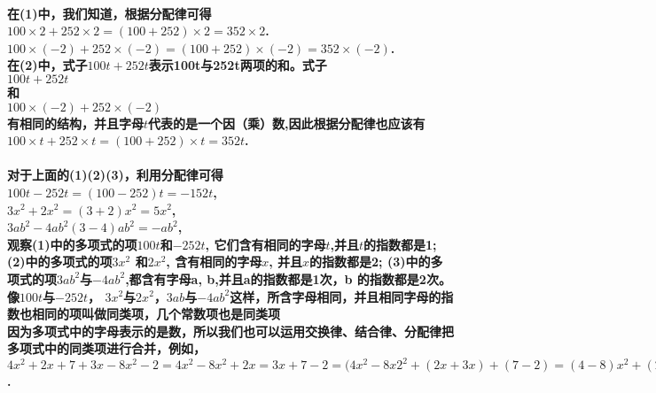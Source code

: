 \documentclass[UTF8]{report}
\theoremstyle{definition}
\theoremstyle{remark}
\begin{document}
\paragraph{在(1)中，我们知道，根据分配律可得\\$100\times2+252\times2=(100+252)\times2=352\times2$.\\$100\times(-2)+252\times(-2)=(100+252)\times(-2)=352\times(-2)$.\\ 在(2)中，式子$100t+252t$表示100t与252t两项的和。式子\\$100t+252t$\\和\\$100\times(-2)+252\times(-2)$\\有相同的结构，并且字母$t$代表的是一个因（乘）数,因此根据分配律也应该有\\$100\times{t}+252\times{t}=(100+252)\times{t}=352t$.}

\paragraph{
对于上面的(1)(2)(3)，利用分配律可得
\\$100t-252t=(100-252)t=-152t$,
\\$3x^{2}+2x^{2}=(3+2)x^{2}=5x^{2}$,
\\$3ab^{2}-4ab^{2}(3-4)ab^{2}=-ab^{2}$,
\\  观察(1)中的多项式的项$100t$和$-252t$, 它们含有相同的字母$t$,并且$t$的指数都是1; (2)中的多项式的项$3x^{2}$ 和$2x^{2}$, 含有相同的字母$x$, 并且$x$的指数都是2; (3)中的多项式的项$3ab^{2}$与$-4ab^{2}$,都含有字母a, b,并且a的指数都是1次，b 的指数都是2次。像$100t$与$-252t$， $3x^{2}$与$2x^{2}$，$3ab$与$-4ab^{2}$这样，所含字母相同，并且相同字母的指数也相同的项叫做同类项，几个常数项也是同类项
\\  因为多项式中的字母表示的是数，所以我们也可以运用交换律、结合律、分配律把多项式中的同类项进行合并，例如，
\\$4x^{2}+2x+7+3x-8x^{2}-2=4x^{2}-8x^{2}+2x=3x+7-2=(4x^{2}-8x2^{2}+(2x+3x)+(7-2)=(4-8)x^{2}+(2+3)x+(7-2)=-4x^{2}+(2+3)x+(7-2)=-4x^{2}+5x+5$.
}
\end{document}
